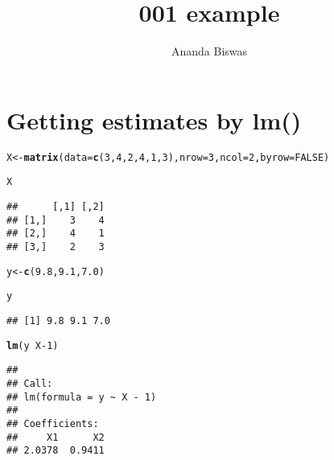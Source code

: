 \documentclass[11pt, a4paper]{article}\usepackage[]{graphicx}\usepackage[]{xcolor}
\title{001 example}
\author{Ananda Biswas}
\date{}
\makeatletter
\newcommand{\hlnum}[1]{\textcolor[rgb]{0.686,0.059,0.569}{#1}}%
\newcommand{\hlopt}[1]{\textcolor[rgb]{0,0,0}{#1}}%
\newcommand{\hlstd}[1]{\textcolor[rgb]{0.345,0.345,0.345}{#1}}%
\newcommand{\hlkwb}[1]{\textcolor[rgb]{0.69,0.353,0.396}{#1}}%
\newcommand{\hlkwc}[1]{\textcolor[rgb]{0.333,0.667,0.333}{#1}}%
\newcommand{\hlkwd}[1]{\textcolor[rgb]{0.737,0.353,0.396}{\textbf{#1}}}%
\newenvironment{kframe}{%
 \def\at@end@of@kframe{}%
 \ifinner\ifhmode%
  \def\at@end@of@kframe{\end{minipage}}%
  \begin{minipage}{\columnwidth}%
 \fi\fi%
 \def\FrameCommand##1{\hskip\@totalleftmargin \hskip-\fboxsep
 \colorbox{shadecolor}{##1}\hskip-\fboxsep
     \hskip-\linewidth \hskip-\@totalleftmargin \hskip\columnwidth}%
 \MakeFramed {\advance\hsize-\width
   \@totalleftmargin\z@ \linewidth\hsize
   \@setminipage}}%
 {\par\unskip\endMakeFramed%
 \at@end@of@kframe}
\newenvironment{knitrout}{}{} %
\makeatother
\begin{document}
\maketitle

\section*{Getting estimates by lm()}

\begin{knitrout}
\color{fgcolor}\begin{kframe}
\begin{alltt}
\hlstd{X} \hlkwb{<-} \hlkwd{matrix}\hlstd{(}\hlkwc{data} \hlstd{=} \hlkwd{c}\hlstd{(}\hlnum{3}\hlstd{,} \hlnum{4}\hlstd{,} \hlnum{2}\hlstd{,} \hlnum{4}\hlstd{,} \hlnum{1}\hlstd{,} \hlnum{3}\hlstd{),} \hlkwc{nrow} \hlstd{=} \hlnum{3}\hlstd{,} \hlkwc{ncol} \hlstd{=} \hlnum{2}\hlstd{,} \hlkwc{byrow} \hlstd{=} \hlnum{FALSE}\hlstd{)}

\hlstd{X}
\end{alltt}
\begin{verbatim}
##      [,1] [,2]
## [1,]    3    4
## [2,]    4    1
## [3,]    2    3
\end{verbatim}
\end{kframe}
\end{knitrout}

\begin{knitrout}
\color{fgcolor}\begin{kframe}
\begin{alltt}
\hlstd{y} \hlkwb{<-} \hlkwd{c}\hlstd{(}\hlnum{9.8}\hlstd{,} \hlnum{9.1}\hlstd{,} \hlnum{7.0}\hlstd{)}

\hlstd{y}
\end{alltt}
\begin{verbatim}
## [1] 9.8 9.1 7.0
\end{verbatim}
\end{kframe}
\end{knitrout}

\begin{knitrout}
\color{fgcolor}\begin{kframe}
\begin{alltt}
\hlkwd{lm}\hlstd{(y} \hlopt{~} \hlstd{X}\hlopt{-}\hlnum{1}\hlstd{)}
\end{alltt}
\begin{verbatim}
## 
## Call:
## lm(formula = y ~ X - 1)
## 
## Coefficients:
##     X1      X2  
## 2.0378  0.9411
\end{verbatim}
\end{kframe}
\end{knitrout}
\end{document}

